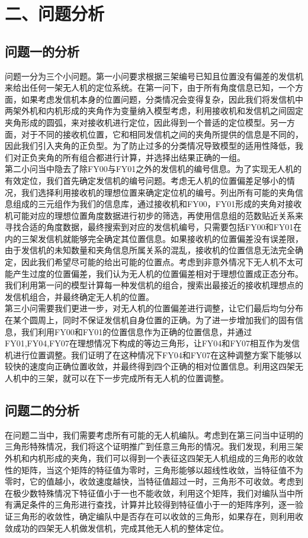 \documentclass{my_paper}
\begin{document}
\section{二、问题分析}
\subsection{问题一的分析}
问题一分为三个小问题。第一小问要求根据三架编号已知且位置没有偏差的发信机来给出任何一架无人机的定位系统。在第一问下，由于所有角度信息已知，一个方面，如果考虑发信机本身的位置问题，分类情况会变得复杂，因此我们将发信机中两架外机和内机形成的夹角作为变量纳入模型考虑，利用接收机和发信机之间固定夹角形成的圆弧，来对接收机进行定位，因此得到一个普适的定位模型。另一方面，对于不同的接收机位置，它和相同发信机之间的夹角所提供的信息是不同的，因此我们引入夹角的正负型。为了防止过多的分类情况导致模型的适用性降低，我们对正负夹角的所有组合都进行计算，并选择出结果正确的一组。\\

第二小问当中隐去了除FY00与FY01之外的发信机的编号信息。为了实现无人机的有效定位，我们首先确定发信机的编号问题。考虑无人机的位置偏差足够小的情况，我们选择利用接收机的理想位置来确定定位机的编号。列出所有可能的夹角信息组成的三元组作为我们的信息库，通过接收机和FY00，FY01形成的夹角对接收机可能对应的理想位置角度数据进行初步的筛选，再使用信息组的范数贴近关系来寻找合适的角度数据，最终搜索到对应的发信机编号，只需要包括FY00和FY01在内的三架发信机就能够完全确定其位置信息。如果接收机的位置偏差没有误差限，由于发信机的未知数量和夹角信息所属关系的混乱，接收机的位置信息无法完全确定，因此我们希望尽可能的给出可能的位置点。考虑到非意外情况下无人机不太可能产生过度的位置偏差，我们认为无人机的位置偏差相对于理想位置成正态分布。我们利用第一问的模型计算每一种发信机的组合，搜索出最接近的接收机理想点的发信机组合，并最终确定无人机的位置。\\

第三小问需要我们更进一步，对无人机的位置偏差进行调整，让它们最后均匀分布在某个圆周上，同时不保证发信机自身位置的正确。为了进一步增加我们的固有信息，我们利用FY00和FY01的位置信息作为正确的位置信息，并通过FY01,FY04,FY07在理想情况下构成的等边三角形，让FY04和FY07相互作为发信机进行位置调整。我们证明了在这种情况下FY04和FY07在这种调整方案下能够以较快的速度向正确位置收敛，并最终得到四个正确的相对位置信息。利用这四架无人机中的三架，就可以在下一步完成所有无人机的位置调整。\cite{liu2017novel}
\subsection{问题二的分析}
在问题二当中，我们需要考虑所有可能的无人机编队。考虑到在第三问当中证明的三角形特殊情况，我们将这个证明推广到任意三角形的情况。我们发现，利用三架外机和内机形成的夹角，我们可以得到一个表征这四架无人机组成的三角形的收敛性的矩阵，当这个矩阵的特征值为零时，三角形能够以超线性收敛，当特征值不为零时，它的值越小，收敛速度越快，当特征值超过一时，三角形不可收敛。考虑到在极少数特殊情况下特征值小于一也不能收敛，利用这个矩阵，我们对编队当中所有满足条件的三角形进行查找，计算并比较得到特征值小于一的矩阵序列，逐一验证三角形的收敛性，确定编队中是否存在可以收敛的三角形，如果存在，则利用收敛成功的四架无人机做发信机，完成其他无人机的整体定位。
\end{document}
